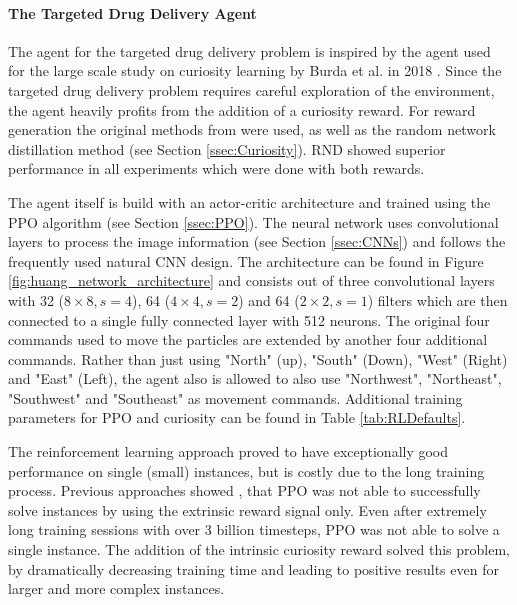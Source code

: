 \paragraph{The Targeted Drug Delivery Agent}
The agent for the targeted drug delivery problem is inspired by the agent used for the large scale study on curiosity learning by Burda et al. in 2018 \cite{burda2018large}. Since the targeted drug delivery problem requires careful exploration of the environment, the agent heavily profits from the addition of a curiosity reward. For reward generation the original methods from \cite{burda2018large} were used, as well as the random network distillation method (see Section \ref{ssec:Curiosity}). RND showed superior performance in all experiments which were done with both rewards. 

The agent itself is build with an actor-critic architecture and trained using the PPO algorithm (see Section \ref{ssec:PPO}). The neural network uses convolutional layers to process the image information (see Section \ref{ssec:CNNs}) and follows the frequently used natural CNN design. The architecture can be found in Figure \ref{fig:huang_network_architecture} and consists out of three convolutional layers with 32 ($8\times 8, s=4$), 64 ($4\times 4, s=2$) and 64 ($2\times 2, s=1$) filters which are then connected to a single fully connected layer with 512 neurons. The original four commands used to move the particles are extended by another four additional commands. Rather than just using "North" (up), "South" (Down), "West" (Right) and "East" (Left), the agent also is allowed to also use "Northwest", "Northeast", "Southwest" and "Southeast" as movement commands. Additional training parameters for PPO and curiosity can be found in Table \ref{tab:RLDefaults}.

The reinforcement learning approach proved to have exceptionally good performance on single (small) instances, but is costly due to the long training process. Previous approaches showed \cite{huang2019}, that PPO was not able to successfully solve instances by using the extrinsic reward signal only. Even after extremely long training sessions with over 3 billion timesteps, PPO was not able to solve a single instance. The addition of the intrinsic curiosity reward solved this problem, by dramatically decreasing training time and leading to positive results even for larger and more complex instances.
